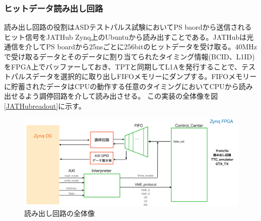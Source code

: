 \subsubsection{ヒットデータ読み出し回路}
\label{subsubsec_DAQ}
読み出し回路の役割はASDテストパルス試験においてPS baordから送信されるヒット信号をJATHub Zynq上のUbuntuから読み出すことである。JATHubは光通信を介してPS boardから25nsごとに256bitのヒットデータを受け取る。40MHzで受け取るデータとそのデータに割り当てられたタイミング情報(BCID、L1ID)をFPGA上でバッファーしておき、TPTと同期してL1Aを発行することで、テストパルスデータを選択的に取り出しFIFOメモリーにダンプする。FIFOメモリーに貯蓄されたデータはCPUの動作する任意のタイミングにおいてCPUから読み出せるよう調停回路を介して読み出させる。
この実装の全体像を図\ref{JATHubreadout}に示す。

\begin{figure} 
\centering
\includegraphics[width=16cm]{fig/JAThubreadout.png}
\caption[読み出し回路の全体像]{読み出し回路の全体像}
\label{fig_CTA}
\end{figure}

